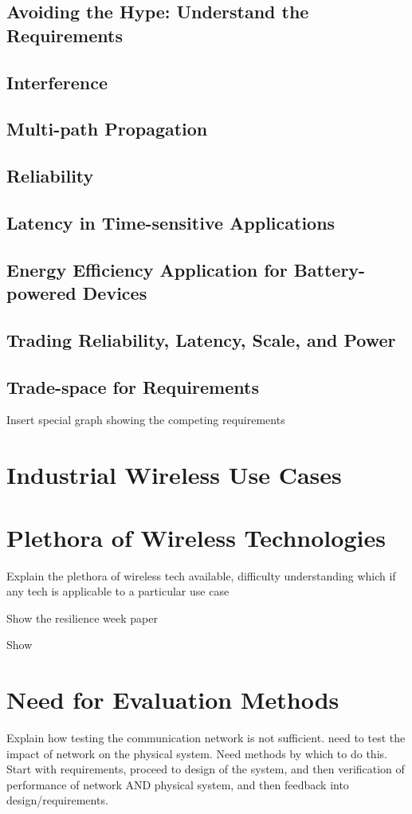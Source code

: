 \subsection{Avoiding the Hype: Understand the Requirements}
\subsection{Interference}
\subsection{Multi-path Propagation}
\subsection{Reliability}
\subsection{Latency in Time-sensitive Applications}
\subsection{Energy Efficiency Application for Battery-powered Devices }
\subsection{Trading Reliability, Latency, Scale, and Power}

\subsection{Trade-space for Requirements}
Insert special graph showing the competing requirements

\section{Industrial Wireless Use Cases}

\section{Plethora of Wireless Technologies}
Explain the plethora of wireless tech available, difficulty understanding which if any tech is applicable to a particular use case

Show the resilience week paper

Show 

\section{Need for Evaluation Methods }
Explain how testing the communication network is not sufficient.  need to test the impact of network on the physical system.  Need methods by which to do this.  Start with requirements, proceed to design of the system, and then verification of performance of network AND physical system, and then feedback into design/requirements.

